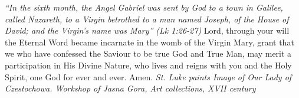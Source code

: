 \pagestyle{empty}
\hspace{0pt}
\vfill

\textit{``In the sixth month, the Angel Gabriel was sent by God to
a town in Galilee, called Nazareth, to a Virgin betrothed to a man
named Joseph, of the House of David; and the Virgin’s name was
Mary'' (Lk 1:26-27)}
\medbreak
Lord, through your will the Eternal Word became incarnate
in the womb of the Virgin Mary, grant that we who have confessed
the Saviour to be true God and True Man, may merit a participation
in His Divine Nature, who lives and reigns with you and the Holy
Spirit, one God for ever and ever. Amen.
\vfill
\textit{St. Luke paints Image of Our Lady of Czestochowa. Workshop of
Jasna Gora, Art collections, XVII century}
\hspace{0pt}
\newpage

